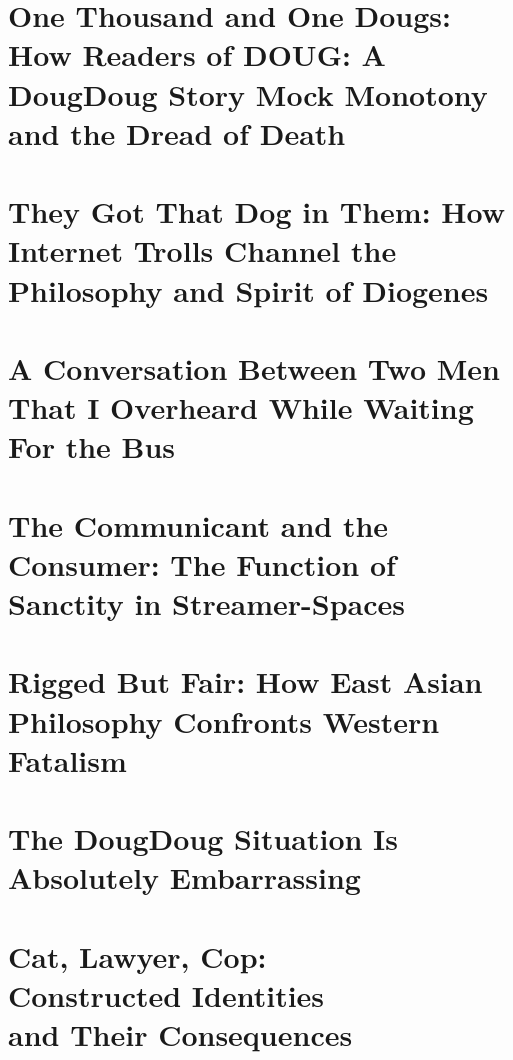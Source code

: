 \documentclass[12pt]{book}
\begin{document}
\chapter{One Thousand and One Dougs: How Readers of DOUG: A DougDoug Story Mock Monotony and the Dread of Death}


\chapter{They Got That Dog in Them: How Internet Trolls Channel the Philosophy and Spirit of Diogenes}


\chapter{A Conversation Between Two Men That I Overheard While Waiting For the Bus}


\chapter{The Communicant and the Consumer: The Function of Sanctity in Streamer-Spaces}


\chapter{Rigged But Fair: How East Asian Philosophy Confronts Western Fatalism}


\chapter{The DougDoug Situation Is Absolutely Embarrassing}


\chapter[Cat, Lawyer, Cop: Constructed Identities and Their Consequences]{Cat, Lawyer, Cop:\\ Constructed Identities\\ and Their Consequences}

\end{document}
